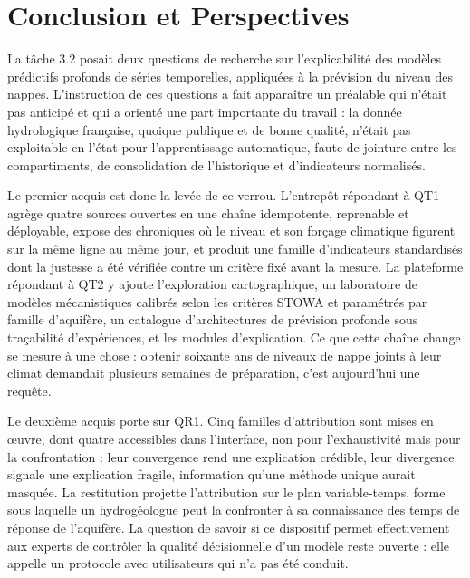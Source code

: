 \newpage
\section{Conclusion et Perspectives}
\label{sec:conclusion}

La tâche 3.2 posait deux questions de recherche sur l'explicabilité des modèles prédictifs profonds de séries temporelles, appliquées à la prévision du niveau des nappes. L'instruction de ces questions a fait apparaître un préalable qui n'était pas anticipé et qui a orienté une part importante du travail : la donnée hydrologique française, quoique publique et de bonne qualité, n'était pas exploitable en l'état pour l'apprentissage automatique, faute de jointure entre les compartiments, de consolidation de l'historique et d'indicateurs normalisés.

Le premier acquis est donc la levée de ce verrou. L'entrepôt répondant à QT1 agrège quatre sources ouvertes en une chaîne idempotente, reprenable et déployable, expose des chroniques où le niveau et son forçage climatique figurent sur la même ligne au même jour, et produit une famille d'indicateurs standardisés dont la justesse a été vérifiée contre un critère fixé avant la mesure. La plateforme répondant à QT2 y ajoute l'exploration cartographique, un laboratoire de modèles mécanistiques calibrés selon les critères STOWA et paramétrés par famille d'aquifère, un catalogue d'architectures de prévision profonde sous traçabilité d'expériences, et les modules d'explication. Ce que cette chaîne change se mesure à une chose : obtenir soixante ans de niveaux de nappe joints à leur climat demandait plusieurs semaines de préparation, c'est aujourd'hui une requête.

Le deuxième acquis porte sur QR1. Cinq familles d'attribution sont mises en œuvre, dont quatre accessibles dans l'interface, non pour l'exhaustivité mais pour la confrontation : leur convergence rend une explication crédible, leur divergence signale une explication fragile, information qu'une méthode unique aurait masquée. La restitution projette l'attribution sur le plan variable-temps, forme sous laquelle un hydrogéologue peut la confronter à sa connaissance des temps de réponse de l'aquifère. La question de savoir si ce dispositif permet effectivement aux experts de contrôler la qualité décisionnelle d'un modèle reste ouverte : elle appelle un protocole avec utilisateurs qui n'a pas été conduit.

